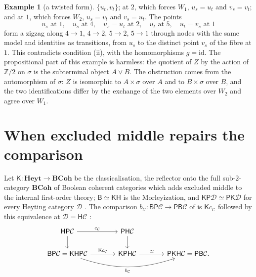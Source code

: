 \documentclass[11pt]{amsart}
\theoremstyle{definition}
\newtheorem{ex}[thm]{Example}
\newcommand{\Heyt}{\mathbf{Heyt}}
\newcommand{\PP}{\mathsf P}
\newcommand{\BB}{\mathsf B}
\newcommand{\HH}{\mathsf H}
\newcommand{\KK}{\mathsf K}
\newcommand{\cC}{\mathcal C}
\newcommand{\cD}{\mathcal D}
\begin{document}
\begin{ex}[a twisted form]
$\{u_t,v_t\}$; at $2$, which forces $W_1$, $u_s=u_t$ and $v_s=v_t$; and
at $1$, which forces $W_2$, $u_s=v_t$ and $v_s=u_t$. The points
\[
u_s\text{ at }1,\quad u_s\text{ at }4,\quad u_s=u_t\text{ at }2,\quad
u_t\text{ at }5,\quad u_t=v_s\text{ at }1
\]
form a zigzag along $4\to1$, $4\to2$, $5\to2$, $5\to1$ through nodes
with the same model and identities as transitions, from $u_s$ to the
distinct point $v_s$ of the fibre at $1$. This contradicts condition
(ii), with the homomorphisms $g=\mathrm{id}$. The propositional part
of this example is harmless: the quotient of $Z$ by the action of
$\mathbb Z/2$ on $\sigma$ is the subterminal object $A\vee B$. The
obstruction comes from the automorphism of $\sigma$: $Z$ is isomorphic
to $A\times\sigma$ over $A$ and to $B\times\sigma$ over $B$, and the
two identifications differ by the exchange of the two elements over
$W_2$ and agree over $W_1$.
\end{ex}

\section{When excluded middle repairs the comparison}

Let $\KK\colon\Heyt\to\mathbf{BCoh}$ be the classicalisation, the
reflector onto the full sub-$2$-category $\mathbf{BCoh}$ of Boolean
coherent categories which adds excluded
middle to the internal first-order theory; $\BB\simeq\KK\HH$ is the
Morleyization, and $\KK\PP\cD\simeq\PP\KK\cD$ for every Heyting
category $\cD$ \cite[Thm.~9.2]{Morley}. The comparison
$b_\cC\colon\BB\PP\cC\to\PP\BB\cC$ of \cite{Morley} is $\KK c_\cC$
followed by this equivalence at $\cD=\HH\cC$
\cite[Cor.~9.3]{Morley}:
\[
\begin{tikzcd}[column sep=large]
\HH\PP\cC\arrow[r,"c_\cC"]\arrow[d]&\PP\HH\cC\arrow[d]\\
\BB\PP\cC=\KK\HH\PP\cC\arrow[r,"\KK c_\cC"]\arrow[rr,bend right=18,
"b_\cC"']&\KK\PP\HH\cC\arrow[r,"\simeq"]&\PP\KK\HH\cC=\PP\BB\cC.
\end{tikzcd}
\]
\end{document}
